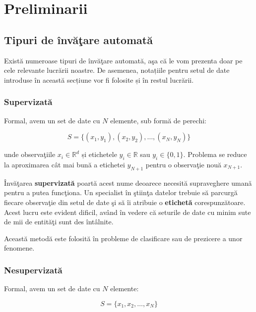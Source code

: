 \chapter{Preliminarii}

\section{Tipuri de învăţare automată}

Există numeroase tipuri de învăţare automată, aşa că le vom prezenta doar 
pe cele relevante lucrării noastre. De asemenea, notațiile pentru setul de 
date introduse în această secțiune vor fi folosite și în restul lucrării.

\subsection{Supervizată}

Formal, avem un set de date cu $N$ elemente, sub formă de perechi:

\begin{equation}
    S = \{(x_{1}, y_{1}), (x_{2}, y_{2}), \dots, (x_{N}, y_{N})\}
\end{equation}

unde observaţiile $x_{i} \in \mathbb{R} ^ d$ și etichetele 
$y_{i} \in \mathbb{R}$ sau $y_{i} \in \{0, 1\}$. 
Problema se reduce la 
aproximarea cât mai bună a etichetei $y_{N + 1}$ pentru o observaţie nouă 
$x_{N + 1}$.

Învăţarea \textbf{supervizată} poartă acest nume deoarece necesită supraveghere 
umană pentru a putea funcţiona. Un specialist în ştiinţa datelor trebuie 
să parcurgă fiecare observaţie din setul de date şi să îi atribuie 
o \textbf{etichetă} corespunzătoare. Acest lucru este evident dificil, având în 
vedere că seturile de date cu minim sute de mii de entităţi sunt des întâlnite.

Această metodă este folosită în probleme de clasificare sau de prezicere 
a unor fenomene.

\subsection{Nesupervizată}

Formal, avem un set de date cu $N$ elemente:

\begin{equation}
    S = \{x_{1}, x_{2}, \dots, x_{N}\}
\end{equation}

